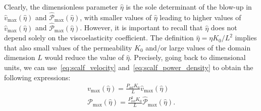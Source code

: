 \documentclass[12pt,a4paper]{amsart}
\theoremstyle{definition}
\newcommand{\heta}{\hat{\eta}}
\begin{document}
Clearly, the dimensionless parameter $\heta$ is the sole determinant of the blow-up in $\hat{v}_{\max }\left( \hat{\eta}\right) $ and $\hat{\mathcal{P}}_{\max }\left( \hat{\eta}\right) $, with smaller values of $\heta$ leading to higher values of $\hat{v}_{\max }\left( \hat{\eta}\right) $ and $\hat{\mathcal{P}}_{\max }\left( \hat{\eta}\right)$.
However, it is important to recall that $\heta$ does not depend solely on the viscoelasticity coefficient. The definition $\heta=\eta K_0/L^2$ implies that also small values of the permeability $K_0$ and/or large values of the domain dimension $L$ would reduce the value of $\heta$. Precisely,
going back to dimensional units, we can use~\eqref{eq:scalf_velocity} and~\eqref{eq:scalf_power_density}
to obtain the following expressions:
\begin{align}
& v_{\max}\left( \hat{\eta} \right) = \frac{P_{\text{ref}} K_0}{L} \hat{v}_{\max }\left( \hat{\eta}\right)
& \label{eq:v_max_dimensional} \\
& \mathcal{P}_{\max} \left( \hat{\eta} \right) = \frac{P_{\text{ref}}^2 K_0}{L}
\hat{\mathcal{P}}_{\max} \left( \hat{\eta} \right). & \label{eq:powerdensity_max_dimensional}
\end{align}
\end{document}
